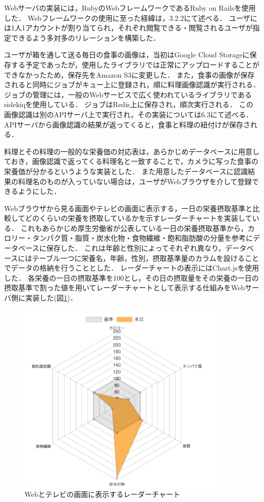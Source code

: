 \documentclass[../report]{subfiles}
\begin{document}
Webサーバの実装には，RubyのWebフレームワークであるRuby on Railsを使用した．
Webフレームワークの使用に至った経緯は，3.2.2にて述べる．
ユーザには1人1アカウントが割り当てられ，それぞれ閲覧できる・閲覧されるユーザが指定できるよう多対多のリレーションを構築した．

ユーザが箱を通して送る毎日の食事の画像は，当初はGoogle Cloud Storageに保存する予定であったが，使用したライブラリでは正常にアップロードすることができなかったため，保存先をAmazon S3に変更した．
また，食事の画像が保存されると同時にジョブがキュー上に登録され，順に料理画像認識が実行される．
ジョブの管理には，一般のWebサービスで広く使われているライブラリであるsidekiqを使用している．
ジョブはRedis上に保存され，順次実行される．
この画像認識は別のAPIサーバ上で実行され，その実装については6.3にて述べる．
APIサーバから画像認識の結果が返ってくると，食事と料理の紐付けが保存される．

料理とその料理の一般的な栄養価の対応表は，あらかじめデータベースに用意しておき，画像認識で返ってくる料理名と一致することで，カメラに写った食事の栄養価が分かるというような実装とした．
また用意したデータベースに認識結果の料理名のものが入っていない場合は，ユーザがWebブラウザを介して登録できるようにした．

Webブラウザから見る画面やテレビの画面に表示する，一日の栄養摂取基準と比較してどのくらいの栄養を摂取しているかを示すレーダーチャートを実装している．
これもあらかじめ厚生労働省が公表している一日の栄養摂取基準から，カロリー・タンパク質・脂質・炭水化物・食物繊維・飽和脂肪酸の分量を参考にデータベースに保存した．
これは年齢と性別によってそれぞれ異なり，データベースにはテーブル一つに栄養名，年齢，性別，摂取基準量のカラムを設けることでデータの格納を行うこととした．
レーダーチャートの表示にはChart.jsを使用した．
各栄養の一日の摂取基準を100とし，その日の摂取量をその栄養の一日の摂取基準で割った値を用いてレーダーチャートとして表示する仕組みをWebサーバ側に実装した(図\ref{fig:6-radarchart})．

\begin{figure}[htbp]
  \begin{center}
    \includegraphics[width=10cm]{imgs/6_radar.png}
    \caption{Webとテレビの画面に表示するレーダーチャート}
    \label{fig:6-radarchart}
  \end{center}
\end{figure}
\end{document}
